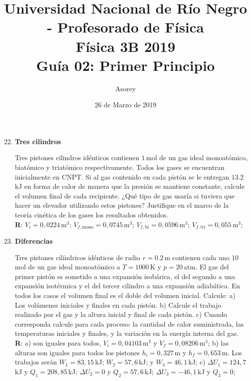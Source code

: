 \documentclass[a4paper,12pt]{article}
\begin{document}
\title{
{\normalsize{Universidad Nacional de Río Negro - Profesorado de Física}}\\
Física 3B 2019 \\ Guía 02: Primer Principio
}
\author{Asorey}
\date{26 de Marzo de 2019}
\maketitle

\begin{enumerate}
	\setcounter{enumi}{21}      %

    \item {\bf{Tres cilindros}}

        Tres pistones cilindros idénticos contienen $1$\,mol de un gas ideal 
        monoatómico, biatómico y triatómico respectivamente. Todos los gases se
        encuentran inicialmente en CNPT. Si al gas contenido en cada pistón se
        le entregan $13.2$\,kJ en forma de calor de manera que la presión se
        mantiene constante, calcule el volumen final de cada recipiente.
        ¿Qué tipo de gas usaría si tuviera que hacer un elevador utilizando 
        estos pistones? Justifique en el marco de la teoría cinética de los
        gases los resultados obtenidos.
		\\{\bf{R}}: $V_i=0,0224$\,m$^3$; $V_{f,\mathrm{mono}}=0,0745$\,m$^3$;
		$V_{f,\mathrm{bi}}=0,0596$\,m$^3$; $V_{f,\mathrm{tri}}=0,055$\,m$^3$;

	\item {\bf{Diferencias}}
		
		Tres pistones cilíndricos idénticos de radio $r=0.2$\,m contienen cada
		uno 10\,mol de un gas ideal monoatómico a $T=1000$\,K y $p=20$\,atm.
		El gas del primer pistón es sometido a una expansión isobárica, el del
		segundo a una expansión isotérmica y el del tercer cilindro a una
		expansión adiabática. En todos los casos el volumen final es el doble
		del volumen inicial. Calcule: a) Los volúmenes iniciales y finales en
		cada pistón. b) Calcule el trabajo realizado por el gas y la altura
		inicial y final de cada pistón. c) Cuando corresponda calcule para cada
		proceso: la cantidad de calor suministrada, las temperaturas iniciales
		y finales, y la variación en la energía interna del gas.
		\\{\bf{R}}: a) son iguales para todos, $V_i=0,04103$\,m$^3$ y
		$V_{f}=0,08206$\,m$^3$; b) las alturas son iguales para todos los
		pistones $h_i=0,327$\,m y $h_f=0,653$\,m. Los trabajos serán
		$W_1=83,15$\,kJ; $W_2=57,6$\,kJ; y $W_3=46,1$\,kJ; c) $\Delta
		U_1=124,7$\,kJ y $Q_1=208,85$\,kJ; $\Delta U_2=0$ y $Q_2=57,6$\,kJ;
		$\Delta U_3=-46,1$\,kJ y $Q_3=0$;  
	

\end{enumerate}
\end{document}
